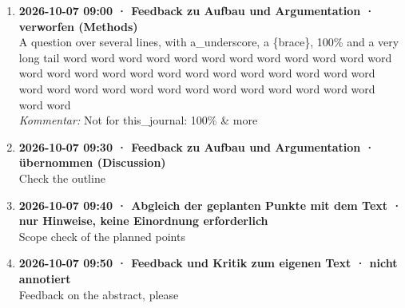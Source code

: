 \begin{enumerate}
  \\ \textit{Kommentar:} - Keep "subjects": the field's term.
  \item \textbf{2026-10-07 09:00 · Feedback zu Aufbau und Argumentation · verworfen (Methods)} \\
  A question over several lines, with a\_underscore, a \{brace\}, 100\% and a very long tail word word word word word word word word word word word word word word word word word word word word word word word word word word word word word word word word word word word word word word word word
  \\ \textit{Kommentar:} Not for this\_journal: 100\% \& more
  \item \textbf{2026-10-07 09:30 · Feedback zu Aufbau und Argumentation · übernommen (Discussion)} \\
  Check the outline
  \item \textbf{2026-10-07 09:40 · Abgleich der geplanten Punkte mit dem Text · nur Hinweise, keine Einordnung erforderlich} \\
  Scope check of the planned points
  \item \textbf{2026-10-07 09:50 · Feedback und Kritik zum eigenen Text · nicht annotiert} \\
  Feedback on the abstract, please
\end{enumerate}
